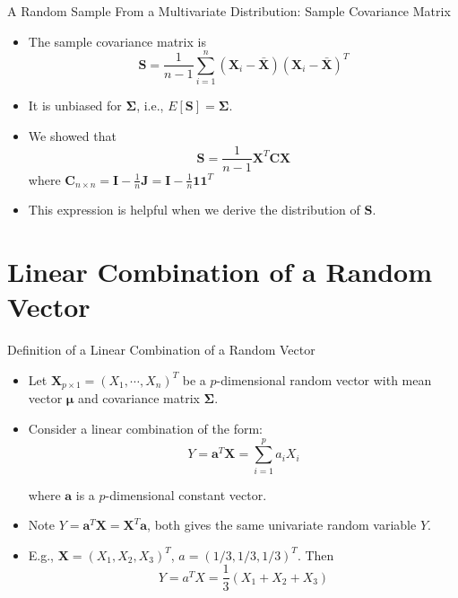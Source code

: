 \documentclass[
  ignorenonframetext,
]{beamer}
\begin{document}
\begin{frame}{A Random Sample From a Multivariate Distribution: Sample
Covariance Matrix}
\protect\hypertarget{a-random-sample-from-a-multivariate-distribution-sample-covariance-matrix}{}
\begin{itemize}
\item
  The sample covariance matrix is
  \[\mathbf S = \frac{1}{n-1}\sum_{i=1}^n(\mathbf X_i-\bar{\mathbf X})(\mathbf X_i-\bar{\mathbf X})^T\]
\item
  It is unbiased for \(\boldsymbol \Sigma\), i.e.,
  \(E[\mathbf S]=\boldsymbol \Sigma\).
\item
  We showed that
  \[\mathbf S= \frac{1}{n-1} \mathbf X^T \mathbf C \mathbf X \] where
  \(\mathbf C_{n\times n}=\mathbf I-\frac{1}{n}\mathbf J=\mathbf I-\frac{1}{n}\mathbf 1 \mathbf 1^T\)
\item
  This expression is helpful when we derive the distribution of
  \(\mathbf S\).
\end{itemize}
\end{frame}

\hypertarget{linear-combination-of-a-random-vector}{%
\section{Linear Combination of a Random
Vector}\label{linear-combination-of-a-random-vector}}

\begin{frame}{Definition of a Linear Combination of a Random Vector}
\protect\hypertarget{definition-of-a-linear-combination-of-a-random-vector}{}
\begin{itemize}
\item
  Let \(\mathbf{X}_{p\times 1}=(X_1, \cdots, X_n)^T\) be a
  \(p\)-dimensional random vector with mean vector \(\boldsymbol{\mu}\)
  and covariance matrix \(\boldsymbol{\Sigma}\).
\item
  Consider a linear combination of the form:
  \[  Y = \mathbf{a}^T\mathbf{X}=\sum_{i=1}^p a_i X_i\]

  where \(\mathbf{a}\) is a \(p\)-dimensional constant vector.
\item
  Note \(Y=\mathbf{a}^T\mathbf{X}=\mathbf{X}^T \mathbf a\), both gives
  the same univariate random variable \(Y\).
\item
  E.g., \(\mathbf X = (X_1, X_2, X_3)^T\), \(a=(1/3, 1/3, 1/3)^T\). Then
  \[Y=a^TX=\frac{1}{3}(X_1 + X_2 + X_3)\]
\end{itemize}
\end{frame}
\end{document}
